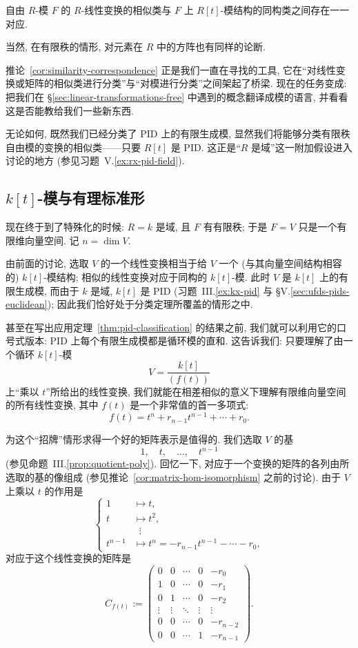 \begin{corollary}\label{cor:similarity-correspondence}
自由 $R$-模 $F$ 的 $R$-线性变换的相似类与 $F$ 上 $R[t]$-模结构的同构类之间存在一一对应.
\end{corollary}

当然, 在有限秩的情形, 对元素在 $R$ 中的方阵也有同样的论断.

推论~\ref{cor:similarity-correspondence} 正是我们一直在寻找的工具, 它在``对线性变换或矩阵的相似类进行分类''与``对模进行分类''之间架起了桥梁. 现在的任务变成: 把我们在 §\ref{sec:linear-transformations-free} 中遇到的概念翻译成模的语言, 并看看这是否能教给我们一些新东西.

无论如何, 既然我们已经分类了 PID 上的有限生成模, 显然我们将能够分类有限秩自由模的变换的相似类——只要 $R[t]$ 是 PID. 这正是``$R$ 是域''这一附加假设进入讨论的地方 (参见习题~V.\ref{ex:rx-pid-field}).

\subsection{\texorpdfstring{$k[t]$}{k[t]}-模与有理标准形}
\label{subsec:rational-canonical}

现在终于到了特殊化的时候: $R=k$ 是域, 且 $F$ 有有限秩; 于是 $F=V$ 只是一个有限维向量空间. 记 $n=\dim V$.

由前面的讨论, 选取 $V$ 的一个线性变换相当于给 $V$ 一个 (与其向量空间结构相容的) $k[t]$-模结构; 相似的线性变换对应于同构的 $k[t]$-模. 此时 $V$ 是 $k[t]$ 上的有限生成模, 而由于 $k$ 是域, $k[t]$ 是 PID (习题~III.\ref{ex:kx-pid} 与 §V.\ref{sec:ufds-pids-euclidean}); 因此我们恰好处于分类定理所覆盖的情形之中.

甚至在写出应用定理~\ref{thm:pid-classification} 的结果之前, 我们就可以利用它的口号式版本: PID 上每个有限生成模都是循环模的直和. 这告诉我们: 只要理解了由一个循环 $k[t]$-模
\[
V=\frac{k[t]}{(f(t))}
\]
上``乘以 $t$''所给出的线性变换, 我们就能在相差相似的意义下理解有限维向量空间的所有线性变换, 其中 $f(t)$ 是一个非常值的首一多项式:
\[
f(t)=t^n+r_{n-1}t^{n-1}+\cdots+r_0.
\]

为这个``招牌''情形求得一个好的矩阵表示是值得的. 我们选取 $V$ 的基
\[
1,\quad t,\quad \ldots,\quad t^{n-1}
\]
(参见命题~III.\ref{prop:quotient-poly}). 回忆一下, 对应于一个变换的矩阵的各列由所选取的基的像组成 (参见推论~\ref{cor:matrix-hom-isomorphism} 之前的讨论). 由于 $V$ 上乘以 $t$ 的作用是
\[
\left\{
\begin{aligned}
1&\longmapsto t,\\
t&\longmapsto t^2,\\
&\;\;\vdots\\
t^{n-1}&\longmapsto t^n=-r_{n-1}t^{n-1}-\cdots-r_0,
\end{aligned}
\right.
\]
对应于这个线性变换的矩阵是
\[
C_{f(t)}:=
\begin{pmatrix}
0&0&\cdots&0&-r_0\\
1&0&\cdots&0&-r_1\\
0&1&\cdots&0&-r_2\\
\vdots&\vdots&\ddots&\vdots&\vdots\\
0&0&\cdots&0&-r_{n-2}\\
0&0&\cdots&1&-r_{n-1}
\end{pmatrix}.
\]

